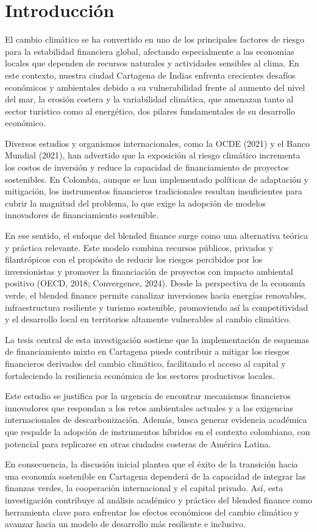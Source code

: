 \section{Introducción}

El cambio climático se ha convertido en uno de los principales factores de riesgo para la estabilidad financiera global, afectando especialmente a las economías locales que dependen de recursos naturales y actividades sensibles al clima. En este contexto, nuestra ciudad Cartagena de Indias enfrenta crecientes desafíos económicos y ambientales debido a su vulnerabilidad frente al aumento del nivel del mar, la erosión costera y la variabilidad climática, que amenazan tanto al sector turístico como al energético, dos pilares fundamentales de su desarrollo económico.

Diversos estudios y organismos internacionales, como la OCDE (2021) y el Banco Mundial (2021), han advertido que la exposición al riesgo climático incrementa los costos de inversión y reduce la capacidad de financiamiento de proyectos sostenibles. En Colombia, aunque se han implementado políticas de adaptación y mitigación, los instrumentos financieros tradicionales resultan insuficientes para cubrir la magnitud del problema, lo que exige la adopción de modelos innovadores de financiamiento sostenible.

En ese sentido, el enfoque del blended finance surge como una alternativa teórica y práctica relevante. Este modelo combina recursos públicos, privados y filantrópicos con el propósito de reducir los riesgos percibidos por los inversionistas y promover la financiación de proyectos con impacto ambiental positivo (OECD, 2018; Convergence, 2024). Desde la perspectiva de la economía verde, el blended finance permite canalizar inversiones hacia energías renovables, infraestructura resiliente y turismo sostenible, promoviendo así la competitividad y el desarrollo local en territorios altamente vulnerables al cambio climático.

La tesis central de esta investigación sostiene que la implementación de esquemas de financiamiento mixto en Cartagena puede contribuir a mitigar los riesgos financieros derivados del cambio climático, facilitando el acceso al capital y fortaleciendo la resiliencia económica de los sectores productivos locales.

Este estudio se justifica por la urgencia de encontrar mecanismos financieros innovadores que respondan a los retos ambientales actuales y a las exigencias internacionales de descarbonización. Además, busca generar evidencia académica que respalde la adopción de instrumentos híbridos en el contexto colombiano, con potencial para replicarse en otras ciudades costeras de América Latina.

En consecuencia, la discusión inicial plantea que el éxito de la transición hacia una economía sostenible en Cartagena dependerá de la capacidad de integrar las finanzas verdes, la cooperación internacional y el capital privado. Así, esta investigación contribuye al análisis académico y práctico del blended finance como herramienta clave para enfrentar los efectos económicos del cambio climático y avanzar hacia un modelo de desarrollo más resiliente e inclusivo.